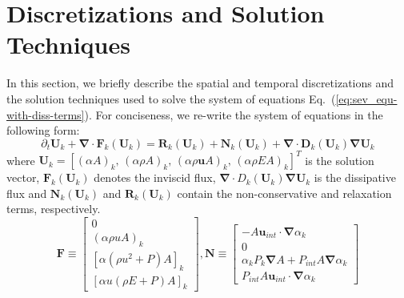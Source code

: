 \documentclass[preprint,10pt]{elsarticle}
\renewcommand{\div}{\mbold{\nabla}\! \cdot \!}
\newcommand{\grad}{\mbold{\nabla}}
\newcommand{\mbold}[1]{\boldsymbol#1}
\newcommand{\eqt}[1]{Eq.~(\ref{#1})}                     %
\begin{document}
\section{Discretizations and Solution Techniques} \label{sec:solution_tech}
In this section, we briefly describe the spatial and temporal discretizations and the solution techniques 
used to solve the system of equations \eqt{eq:sev_equ-with-diss-terms}. For conciseness, we re-write the system of 
equations in the following form:
\begin{equation}
\label{eq:form}
\partial_t \mathbf{U}_k + \div \mathbf{F}_k \left( \mathbf{U}_k \right) = \mathbf{R}_k \left( \mathbf{U}_k \right) + \mathbf{N}_k \left( \mathbf{U}_k \right) + \div \mathbf{D}_k(\mathbf{U}_k) \grad \mathbf{U}_k
\end{equation}
where $\mathbf{U}_k=[(\alpha A )_k, \, (\alpha \rho A)_k,\, (\alpha \rho \mbold{u} A)_k,\, (\alpha \rho E A)_k]^T$ is the solution vector, $\mathbf{F}_k \left( \mathbf{U}_k \right)$ denotes the inviscid flux, $\div D_k (\mathbf{U}_k) \grad \mathbf{U}_k$ is the dissipative flux and $\mathbf{N}_k \left( \mathbf{U}_k \right)$ and $\mathbf{R}_k \left( \mathbf{U}_k \right)$ contain the non-conservative and relaxation terms, respectively. 
\begin{equation}
  \mathbf{F} \equiv
  \begin{bmatrix}
      0     \\
    ( \alpha \rho u A )_k     \\
    \left[ \alpha \left(\rho u^2 + P \right) A \right ]_k  \\
    \left[ \alpha u (\rho E + P) A \right]_k
  \end{bmatrix},
  \mathbf{N} \equiv
  \begin{bmatrix}
      - A \mbold{u}_{int} \cdot \grad \alpha_k     \\
    0     \\
    \alpha_k P_k \grad A + P_{int} A \grad \alpha_k  \\
    P_{int} A \mbold{u}_{int} \cdot \grad \alpha_k
  \end{bmatrix} \nonumber
\end{equation}
\end{document}
